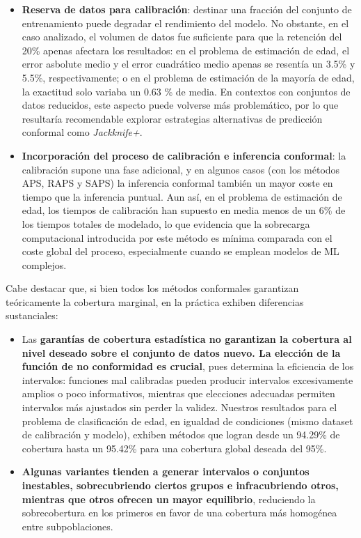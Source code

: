 \begin{itemize}

    \item \textbf{Reserva de datos para calibración}: destinar una fracción del conjunto de entrenamiento puede degradar el rendimiento del modelo. No obstante, en el caso analizado, el volumen de datos fue suficiente para que la retención del 20\% apenas afectara los resultados: en el problema de estimación de edad, el error asbolute medio y el error cuadrático medio apenas se resentía un 3.5\% y 5.5\%, respectivamente; o en el problema de estimación de la mayoría de edad, la exactitud solo variaba un 0.63 \% de media. En contextos con conjuntos de datos reducidos, este aspecto puede volverse más problemático, por lo que resultaría recomendable explorar estrategias alternativas de predicción conformal como \textit{Jackknife+}. 
    
    \item \textbf{Incorporación del proceso de calibración e inferencia conformal}: la calibración supone una fase adicional, y en algunos casos (con los métodos APS, RAPS y SAPS) la inferencia conformal también un mayor coste en tiempo que la inferencia puntual. Aun así, en el problema de estimación de edad, los tiempos de calibración han supuesto en media menos de un 6\% de los tiempos totales de modelado, lo que evidencia que la sobrecarga computacional introducida por este método es mínima comparada con el coste global del proceso, especialmente cuando se emplean modelos de ML complejos. 

\end{itemize}



Cabe destacar que, si bien todos los métodos conformales garantizan teóricamente la cobertura marginal, en la práctica exhiben diferencias sustanciales:

\begin{itemize}

    \item Las \textbf{garantías de cobertura estadística no garantizan la cobertura al nivel deseado sobre el conjunto de datos nuevo. La elección de la función de no conformidad es crucial}, pues determina la eficiencia de los intervalos: funciones mal calibradas pueden producir intervalos excesivamente amplios o poco informativos, mientras que elecciones adecuadas permiten intervalos más ajustados sin perder la validez. Nuestros resultados para el problema de clasificación de edad, en igualdad de condiciones (mismo dataset de calibración y modelo), exhiben métodos que logran desde un 94.29\% de cobertura hasta un 95.42\% para una cobertura global deseada del 95\%. 
    
    \item \textbf{Algunas variantes tienden a generar intervalos o conjuntos inestables, sobrecubriendo ciertos grupos e infracubriendo otros, mientras que otros ofrecen un mayor equilibrio}, reduciendo la sobrecobertura en los primeros en favor de una cobertura más homogénea entre subpoblaciones.
     
\end{itemize}


